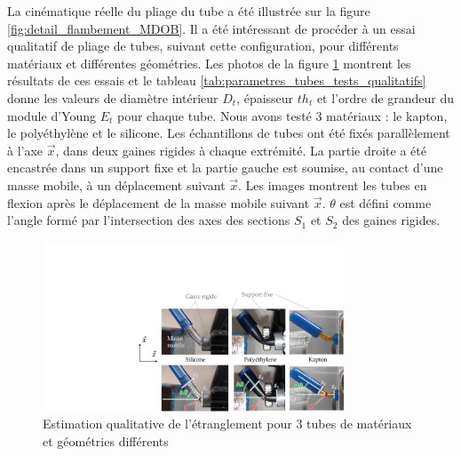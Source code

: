 La cinématique réelle du pliage du tube a été illustrée sur la figure \ref{fig:detail_flambement_MDOB}. Il a été intéressant de procéder à un essai qualitatif de pliage de tubes,  suivant cette configuration, pour différents matériaux et différentes géométries. Les photos de la figure \ref{fig:materiaux_tubes_plies} montrent les résultats de ces essais et le tableau \ref{tab:parametres_tubes_tests_qualitatifs} donne les valeurs de diamètre intérieur $D_t$, épaisseur $th_t$ et l'ordre de grandeur du module d'Young $E_t$ pour chaque tube. Nous avons testé 3 matériaux : le kapton, le polyéthylène et le silicone. Les échantillons de tubes ont été fixés parallèlement à l'axe $\vec{x}$, dans deux gaines rigides à chaque extrémité. La partie droite a été encastrée dans un support fixe et la partie gauche est soumise, au contact d'une masse mobile, à un déplacement suivant $\vec{x}$. Les images montrent les tubes en flexion après le déplacement de la masse mobile suivant $\vec{x}$. $\theta$ est défini comme l'angle formé par l'intersection des axes des sections $S_1$ et $S_2$ des gaines rigides.
\begin{figure}[ht!]
	\begin{center}
		\captionsetup{justification=centering}
		\includegraphics[trim={10.5cm 0cm 0cm 5.5cm},clip,width=0.8\textwidth]{../Chap4/Figure/materiaux_tubes_plies.pdf}
		\caption{Estimation qualitative de l'étranglement pour 3 tubes de matériaux et géométries différents}
		\label{fig:materiaux_tubes_plies}
	\end{center}
\end{figure}
